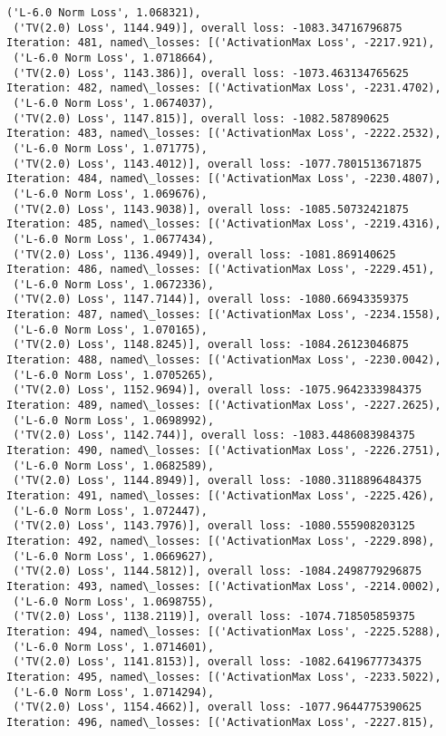 \documentclass[10pt]{article}
\begin{document}
\begin{Verbatim}[commandchars=\\\{\}]
 ('L-6.0 Norm Loss', 1.068321),
 ('TV(2.0) Loss', 1144.949)], overall loss: -1083.34716796875
Iteration: 481, named\_losses: [('ActivationMax Loss', -2217.921),
 ('L-6.0 Norm Loss', 1.0718664),
 ('TV(2.0) Loss', 1143.386)], overall loss: -1073.463134765625
Iteration: 482, named\_losses: [('ActivationMax Loss', -2231.4702),
 ('L-6.0 Norm Loss', 1.0674037),
 ('TV(2.0) Loss', 1147.815)], overall loss: -1082.587890625
Iteration: 483, named\_losses: [('ActivationMax Loss', -2222.2532),
 ('L-6.0 Norm Loss', 1.071775),
 ('TV(2.0) Loss', 1143.4012)], overall loss: -1077.7801513671875
Iteration: 484, named\_losses: [('ActivationMax Loss', -2230.4807),
 ('L-6.0 Norm Loss', 1.069676),
 ('TV(2.0) Loss', 1143.9038)], overall loss: -1085.50732421875
Iteration: 485, named\_losses: [('ActivationMax Loss', -2219.4316),
 ('L-6.0 Norm Loss', 1.0677434),
 ('TV(2.0) Loss', 1136.4949)], overall loss: -1081.869140625
Iteration: 486, named\_losses: [('ActivationMax Loss', -2229.451),
 ('L-6.0 Norm Loss', 1.0672336),
 ('TV(2.0) Loss', 1147.7144)], overall loss: -1080.66943359375
Iteration: 487, named\_losses: [('ActivationMax Loss', -2234.1558),
 ('L-6.0 Norm Loss', 1.070165),
 ('TV(2.0) Loss', 1148.8245)], overall loss: -1084.26123046875
Iteration: 488, named\_losses: [('ActivationMax Loss', -2230.0042),
 ('L-6.0 Norm Loss', 1.0705265),
 ('TV(2.0) Loss', 1152.9694)], overall loss: -1075.9642333984375
Iteration: 489, named\_losses: [('ActivationMax Loss', -2227.2625),
 ('L-6.0 Norm Loss', 1.0698992),
 ('TV(2.0) Loss', 1142.744)], overall loss: -1083.4486083984375
Iteration: 490, named\_losses: [('ActivationMax Loss', -2226.2751),
 ('L-6.0 Norm Loss', 1.0682589),
 ('TV(2.0) Loss', 1144.8949)], overall loss: -1080.3118896484375
Iteration: 491, named\_losses: [('ActivationMax Loss', -2225.426),
 ('L-6.0 Norm Loss', 1.072447),
 ('TV(2.0) Loss', 1143.7976)], overall loss: -1080.555908203125
Iteration: 492, named\_losses: [('ActivationMax Loss', -2229.898),
 ('L-6.0 Norm Loss', 1.0669627),
 ('TV(2.0) Loss', 1144.5812)], overall loss: -1084.2498779296875
Iteration: 493, named\_losses: [('ActivationMax Loss', -2214.0002),
 ('L-6.0 Norm Loss', 1.0698755),
 ('TV(2.0) Loss', 1138.2119)], overall loss: -1074.718505859375
Iteration: 494, named\_losses: [('ActivationMax Loss', -2225.5288),
 ('L-6.0 Norm Loss', 1.0714601),
 ('TV(2.0) Loss', 1141.8153)], overall loss: -1082.6419677734375
Iteration: 495, named\_losses: [('ActivationMax Loss', -2233.5022),
 ('L-6.0 Norm Loss', 1.0714294),
 ('TV(2.0) Loss', 1154.4662)], overall loss: -1077.9644775390625
Iteration: 496, named\_losses: [('ActivationMax Loss', -2227.815),

\end{Verbatim}
\end{document}
